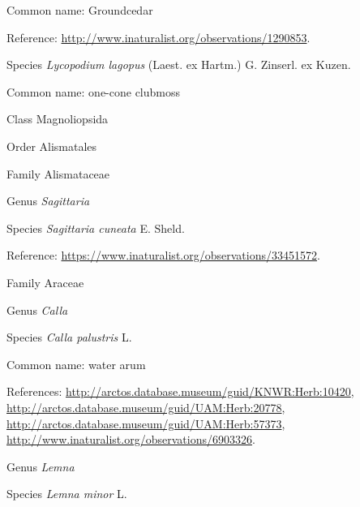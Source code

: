 \documentclass[9pt, article]{memoir}
\begin{document}
\begin{multicols}{2}
Common name: Groundcedar

Reference: 
\url{http://www.inaturalist.org/observations/1290853}.

\vspace{6pt}\noindent\hspace{36pt}Species \textit{Lycopodium lagopus} (Laest. ex Hartm.) G. Zinserl. ex Kuzen.


Common name: one-cone clubmoss

\vspace{6pt}\noindent\hspace{12pt}Class Magnoliopsida


\vspace{6pt}\noindent\hspace{18pt}Order Alismatales


\vspace{6pt}\noindent\hspace{24pt}Family Alismataceae


\vspace{6pt}\noindent\hspace{30pt}Genus \textit{Sagittaria}


\vspace{6pt}\noindent\hspace{36pt}Species \textit{Sagittaria cuneata} E. Sheld.


Reference: 
\url{https://www.inaturalist.org/observations/33451572}.

\vspace{6pt}\noindent\hspace{24pt}Family Araceae


\vspace{6pt}\noindent\hspace{30pt}Genus \textit{Calla}


\vspace{6pt}\noindent\hspace{36pt}Species \textit{Calla palustris} L.


Common name: water arum

References: 
\url{http://arctos.database.museum/guid/KNWR:Herb:10420}, 
\url{http://arctos.database.museum/guid/UAM:Herb:20778}, 
\url{http://arctos.database.museum/guid/UAM:Herb:57373}, 
\url{http://www.inaturalist.org/observations/6903326}.

\vspace{6pt}\noindent\hspace{30pt}Genus \textit{Lemna}


\vspace{6pt}\noindent\hspace{36pt}Species \textit{Lemna minor} L.



\end{multicols}
\end{document}
